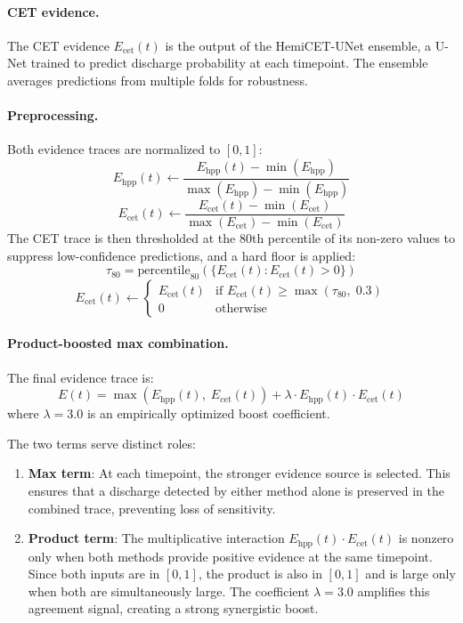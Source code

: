 \paragraph{CET evidence.}
The CET evidence $E_{\mathrm{cet}}(t)$ is the output of the HemiCET-UNet ensemble, a U-Net trained to predict discharge probability at each timepoint. The ensemble averages predictions from multiple folds for robustness.

\paragraph{Preprocessing.}
Both evidence traces are normalized to $[0,1]$:
\[ E_{\mathrm{hpp}}(t) \leftarrow \frac{E_{\mathrm{hpp}}(t) - \min(E_{\mathrm{hpp}})}{\max(E_{\mathrm{hpp}}) - \min(E_{\mathrm{hpp}})} \tag{5} \]
\[ E_{\mathrm{cet}}(t) \leftarrow \frac{E_{\mathrm{cet}}(t) - \min(E_{\mathrm{cet}})}{\max(E_{\mathrm{cet}}) - \min(E_{\mathrm{cet}})} \tag{6} \]
The CET trace is then thresholded at the 80th percentile of its non-zero values to suppress low-confidence predictions, and a hard floor is applied:
\[ \tau_{80} = \mathrm{percentile}_{80}\!\left(\{E_{\mathrm{cet}}(t) : E_{\mathrm{cet}}(t) > 0\}\right) \tag{7} \]
\[ E_{\mathrm{cet}}(t) \leftarrow \begin{cases} E_{\mathrm{cet}}(t) & \text{if } E_{\mathrm{cet}}(t) \geq \max(\tau_{80},\; 0.3) \\ 0 & \text{otherwise} \end{cases} \tag{8} \]

\paragraph{Product-boosted max combination.}
The final evidence trace is:
\[ E(t) = \max\!\left(E_{\mathrm{hpp}}(t),\; E_{\mathrm{cet}}(t)\right) + \lambda \cdot E_{\mathrm{hpp}}(t) \cdot E_{\mathrm{cet}}(t) \tag{9} \]
where $\lambda = 3.0$ is an empirically optimized boost coefficient.

The two terms serve distinct roles:
\begin{enumerate}
  \item \textbf{Max term}: At each timepoint, the stronger evidence source is selected. This ensures that a discharge detected by either method alone is preserved in the combined trace, preventing loss of sensitivity.
  \item \textbf{Product term}: The multiplicative interaction $E_{\mathrm{hpp}}(t) \cdot E_{\mathrm{cet}}(t)$ is nonzero only when both methods provide positive evidence at the same timepoint. Since both inputs are in $[0,1]$, the product is also in $[0,1]$ and is large only when both are simultaneously large. The coefficient $\lambda = 3.0$ amplifies this agreement signal, creating a strong synergistic boost.
\end{enumerate}

